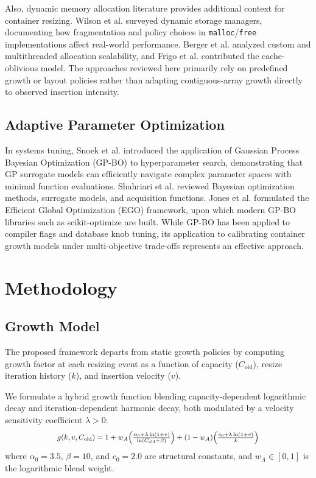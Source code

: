 \documentclass[conference]{IEEEtran}
\begin{document}
Also, dynamic memory allocation literature provides additional context for container resizing. Wilson et al. \cite{dynamic_storage_allocation} surveyed dynamic storage managers, documenting how fragmentation and policy choices in \texttt{malloc}/\texttt{free} implementations affect real-world performance. Berger et al. \cite{reconsidering_custom_allocation, hoard_allocator} analyzed custom and multithreaded allocation scalability, and Frigo et al. \cite{frigo_cache_oblivious} contributed the cache-oblivious model. The approaches reviewed here primarily rely on predefined growth or layout policies rather than adapting contiguous-array growth directly to observed insertion intensity.

\subsection{Adaptive Parameter Optimization}
In systems tuning, Snoek et al. \cite{practical_bayesian_opt} introduced the application of Gaussian Process Bayesian Optimization (GP-BO) to hyperparameter search, demonstrating that GP surrogate models can efficiently navigate complex parameter spaces with minimal function evaluations. Shahriari et al. \cite{bayesian_opt_review} reviewed Bayesian optimization methods, surrogate models, and acquisition functions. Jones et al. \cite{jones_ego} formulated the Efficient Global Optimization (EGO) framework, upon which modern GP-BO libraries such as scikit-optimize \cite{scikit_optimize} are built. While GP-BO has been applied to compiler flags and database knob tuning, its application to calibrating container growth models under multi-objective trade-offs represents an effective approach.

\section{Methodology}

\subsection{Growth Model}
The proposed framework departs from static growth policies by computing growth factor at each resizing event as a function of capacity ($C_{\text{old}}$), resize iteration history ($k$), and insertion velocity ($v$). 

We formulate a hybrid growth function blending capacity-dependent logarithmic decay and iteration-dependent harmonic decay, both modulated by a velocity sensitivity coefficient $\lambda > 0$:
\begin{equation}
    \scalebox{0.88}{$g(k,v,C_{\text{old}}) = 1 + w_A \!\left( \frac{\alpha_0 + \lambda \ln(1+v)}{\ln(C_{\text{old}} + \beta)} \right) + (1-w_A) \!\left( \frac{c_0 + \lambda \ln(1+v)}{k} \right)$}
    \label{eq:hybrid}
\end{equation}
where $\alpha_0 = 3.5$, $\beta = 10$, and $c_0 = 2.0$ are structural constants, and $w_A \in [0,1]$ is the logarithmic blend weight.
\end{document}

